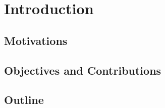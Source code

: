 \chapter{Introduction}

\section{Motivations}

\section{Objectives and Contributions}

\section{Outline}
